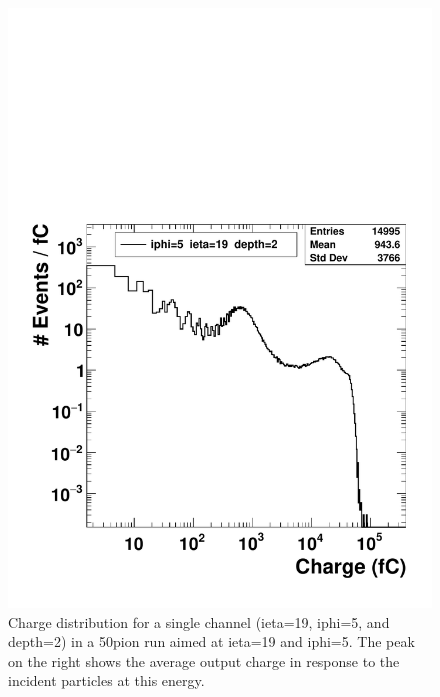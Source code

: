 \begin{figure}
\centering
\includegraphics[width=0.7\linewidth]{Figures/pioncharge.pdf}
\caption{Charge distribution for a single channel (ieta=19, iphi=5, and depth=2) in a 50\GeV\space pion run aimed at ieta=19 and iphi=5. The peak on the right shows the average output charge in response to the incident particles at this energy.}
\label{fig:pioncharge}
\end{figure}

